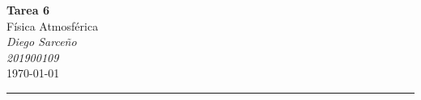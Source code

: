 




%


\textcolor{DS_Black}{
\begin{minipage}{0.85\textwidth}
    \begin{center}
        \textbf{\Large Tarea 6}\\
        \vspace{5pt}
        Física Atmosférica \\
        \vspace{20pt}
        \textit{Diego Sarceño} \\
        \vspace{5pt}
        \footnotesize{\textit{201900109}} \\
        \vspace{5pt}
        \today
    \end{center}
\end{minipage}
\vspace{10pt}
\hrule
}